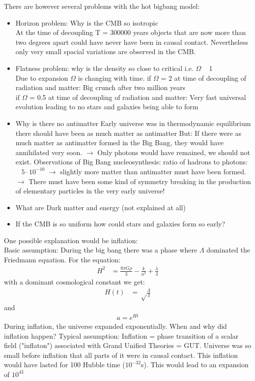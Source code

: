 \documentclass[11pt,a4paper]{article}
\begin{document}
There are however several problems with the hot bigbang model:
\begin{itemize}
    \item Horizon problem: Why is the CMB so isotropic \\ 
        At the time of decoupling T = 300000 years objects that are now more than two degrees apart could have never have been in causal contact. 
    Nevertheless only very small spacial variations are observed in the CMB.
    \item Flatness problem: why is the density so close to critical i.e. $\Omega$ ~ 1\\ 
        Due to expansion $\Omega$ is changing with time. 
        if $\Omega$ = 2 at time of decoupling of radiation and matter:
        Big crunch after two million years\\ 
        if $\Omega$ = 0.5 at time of decoupling of radiation and matter:
        Very fast universal evolution leading to no stars and galaxies being able to form
    \item Why is there no antimatter 
        Early universe was in thermodynamic equilibrium
 there should have been as much matter as antimatter
But: If there were as much matter as antimatter formed in the Big Bang, they
would have annihilated very soon.
$\rightarrow$ Only photons would have remained, we should not exist.
Observations of Big Bang nucleosynthesis: ratio of hadrons to photons: ~ $5 \cdot 10^{-10}$
$\rightarrow$ slightly more matter than antimatter must have been formed.
$\rightarrow$ There must have been some kind of symmetry breaking in the production of
elementary particles in the very early universe!
    \item What are Dark matter and energy (not explained at all)
    \item If the CMB is so uniform how could stars and galaxies form so early?
\end{itemize}

One possible explanation would be inflation: \\
Basic assumption:
During the big bang there was a phase where $\Lambda$ dominated the Friedmann equation.
For the equation:
\begin{align*}
    H^2 &= \frac {8 \pi G \rho}{3} - \frac k {a^2} + \frac \lambda 3  
\end{align*}
with a dominant cosmological constant we get: 
\begin{align*}
    H(t) &= \sqrt \frac \Lambda 3 
\end{align*}
and 
\begin{align*}
    a = e^{Ht} 
\end{align*}
During inflation, the universe expanded exponentially.
When and why did inflation happen?
Typical assumption: Inflation = phase transition of a scalar field ("inflaton") associated with Grand Unified Theories = GUT.
Universe was so small before inflation that all parts of it were in causal contact.
This inflation would have lasted for 100 Hubble time ($10^{-32}$s). 
This would lead to an expansion of $10^43$
\end{document}
